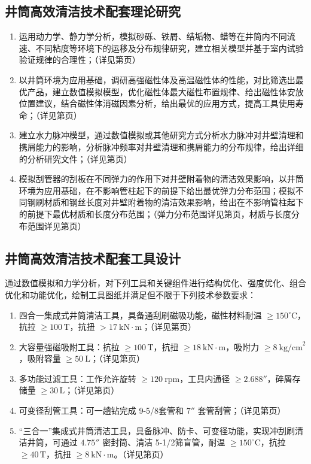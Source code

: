 \subsection{井筒高效清洁技术配套理论研究}
\begin{enumerate}[label=(\arabic*),leftmargin=2em,itemsep=0pt]
\item 运用动力学、静力学分析，模拟砂砾、铁屑、结垢物、蜡等在井筒内不同流速、不同粘度等环境下的运移及分布规律研究，建立相关模型并基于室内试验验证规律的合理性；（详见第\pageref{keliyunyi}页）
\item 以井筒环境为应用基础，调研高强磁性体及高温磁性体的性能，对比筛选出最优产品，建立数值模拟模型，优化磁性体最大磁性布置规律、给出磁性体安放位置建议，结合磁性体消磁因素分析，给出最优的应用方式，提高工具使用寿命；（详见第\pageref{citimoni}页）
\item 建立水力脉冲模型，通过数值模拟或其他研究方式分析水力脉冲对井壁清理和携屑能力的影响，分析脉冲频率对井壁清理和携屑能力的分布规律，给出详细的分析研究文件；（详见第\pageref{shuilimaichong}页）
\item 模拟刮管器的刮板在不同弹力的作用下对井壁附着物的清洁效果影响，以井筒环境为应用基础，在不影响管柱起下的前提下给出最优弹力分布范围；模拟不同钢刷材质和钢丝长度对井壁附着物的清洁效果影响，给出在不影响管柱起下的前提下最优材质和长度分布范围；（弹力分布范围详见第\pageref{subsec:scraper_spring_force}页，材质与长度分布范围详见第\pageref{subsec:brush_material_length}页）
\end{enumerate}

\subsection{井筒高效清洁技术配套工具设计}
通过数值模拟和力学分析，对下列工具和关键组件进行结构优化、强度优化、组合优化和功能优化，绘制工具图纸并满足但不限于下列技术参数要求：
\begin{enumerate}[label=(\arabic*),leftmargin=2em,itemsep=0pt]
\item 四合一集成式井筒清洁工具，具备通刮刷磁吸功能，磁性材料耐温 $\ge 150^\circ\text{C}$，抗拉 $\ge 100\,\text{T}$，抗扭 $>17\ \text{kN}\cdot\text{m}$；（详见第\pageref{siheyi}页）
\item 大容量强磁吸附工具：抗拉 $\ge 100\,\text{T}$，抗扭 $\ge 18\ \text{kN}\cdot\text{m}$，吸附力 $\ge 8\ \text{kg/cm}^2$，吸附容量 $\ge 50\ \text{L}$；（详见第\pageref{darongliangqiangci}页）
\item 多功能过滤工具：工作允许旋转 $\ge 120\ \text{rpm}$，工具内通径 $\ge 2.688''$，碎屑存储量 $\ge 30\,\text{L}$；（详见第\pageref{duogongnengguolv}页）
\item 可变径刮管工具：可一趟钻完成 9-5/8\inch  套管和 $7''$ 套管刮管；（详见第\pageref{kebianjingguaguan}页）
\item “三合一”集成式井筒清洁工具，具备脉冲、防卡、可变径功能，实现冲刮刷清洁井筒，可通过 $4.75''$ 密封筒、清洁 5-1/2\inch  筛盲管，耐温 $\ge 150^\circ\text{C}$，抗拉 $\ge 40\,\text{T}$，抗扭 $\ge 8\ \text{kN}\cdot\text{m}$。（详见第\pageref{sanheyi}页）
\end{enumerate}

